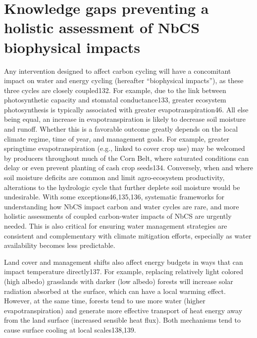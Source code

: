 \documentclass[
  letterpaper,
  DIV=11,
  numbers=noendperiod]{scrreprt}
\begin{document}
\hypertarget{sec-holistic}{%
\section{Knowledge gaps preventing a holistic assessment of NbCS
biophysical impacts}\label{sec-holistic}}

Any intervention designed to affect carbon cycling will have a
concomitant impact on water and energy cycling (hereafter ``biophysical
impacts''), as these three cycles are closely coupled132. For example,
due to the link between photosynthetic capacity and stomatal
conductance133, greater ecosystem photosynthesis is typically associated
with greater evapotranspiration46. All else being equal, an increase in
evapotranspiration is likely to decrease soil moisture and runoff.
Whether this is a favorable outcome greatly depends on the local climate
regime, time of year, and management goals. For example, greater
springtime evapotranspiration (e.g., linked to cover crop use) may be
welcomed by producers throughout much of the Corn Belt, where saturated
conditions can delay or even prevent planting of cash crop seeds134.
Conversely, when and where soil moisture deficits are common and limit
agro-ecosystem productivity, alterations to the hydrologic cycle that
further deplete soil moisture would be undesirable. With some
exceptions46,135,136, systematic frameworks for understanding how NbCS
impact carbon and water cycles are rare, and more holistic assessments
of coupled carbon-water impacts of NbCS are urgently needed. This is
also critical for ensuring water management strategies are consistent
and complementary with climate mitigation efforts, especially as water
availability becomes less predictable.

Land cover and management shifts also affect energy budgets in ways that
can impact temperature directly137. For example, replacing relatively
light colored (high albedo) grasslands with darker (low albedo) forests
will increase solar radiation absorbed at the surface, which can have a
local warming effect. However, at the same time, forests tend to use
more water (higher evapotranspiration) and generate more effective
transport of heat energy away from the land surface (increased sensible
heat flux). Both mechanisms tend to cause surface cooling at local
scales138,139.
\end{document}
